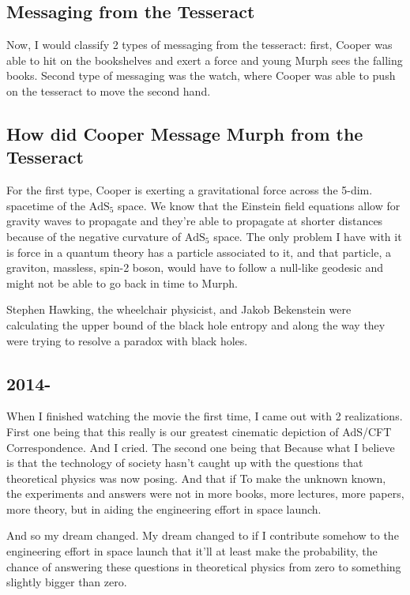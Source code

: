\documentclass[10pt]{amsart}
\begin{document}
\subsection{Messaging from the Tesseract}

Now, I would classify 2 types of messaging from the tesseract: first, Cooper was able to hit on the bookshelves and exert a force and young Murph sees the falling books. Second type of messaging was the watch, where Cooper was able to push on the tesseract to move the second hand.
 
\subsection{How did Cooper Message Murph from the Tesseract}

For the first type, Cooper is exerting a gravitational force across the 5-dim. spacetime of the $\text{AdS}_5$ space. We know that the Einstein field equations allow for gravity waves to propagate and they're able to propagate at shorter distances because of the negative curvature of $\text{AdS}_5$ space. The only problem I have with it is force in a quantum theory has a particle associated to it, and that particle, a graviton, massless, spin-2 boson, would have to follow a null-like geodesic and might not be able to go back in time to Murph.

Stephen Hawking, the wheelchair physicist, and Jakob Bekenstein were calculating the upper bound of the black hole entropy and along the way they were trying to resolve a paradox with black holes.

\subsection{2014-}

When I finished watching the movie the first time, I came out with 2 realizations. First one being that this really is our greatest cinematic depiction of AdS/CFT Correspondence. And I cried. The second one being that 
Because what I believe is that the technology of society hasn't caught up with the questions that theoretical physics was now posing.
And that if 
To make the unknown known, the experiments and answers were not in more books, more lectures, more papers, more theory, but in aiding the engineering effort in space launch.

And so my dream changed. My dream changed to if I contribute somehow to the engineering effort in space launch that it'll at least make the probability, the chance of answering these questions in theoretical physics from zero to something slightly bigger than zero.
\end{document}

